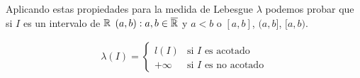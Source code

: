 Aplicando estas propiedades para la medida de Lebesgue \(\lambda\) podemos probar que si \(I\) es un intervalo de \(\mathbb{R}\) \((a, b) : a, b \in \overline{\mathbb{R}}\) y \(a<b\) o \([a, b]\), \((a, b]\), \([a, b)\).

\begin{align*}
    \lambda(I) = \begin{cases}
                     l(I)    & \text{si } I \text{ es acotado}    \\
                     +\infty & \text{si } I \text{ es no acotado}
                 \end{cases}
\end{align*}
